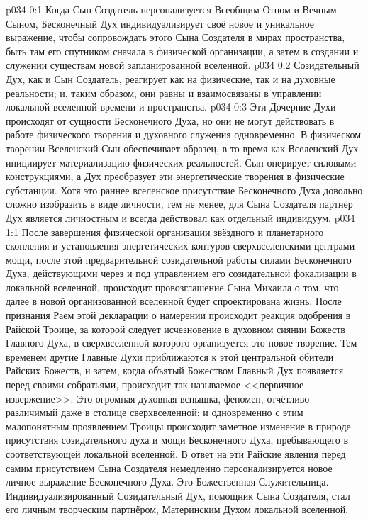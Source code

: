 \author{Могущественный Посланник}
\vs p034 0:1 Когда Сын Создатель персонализуется Всеобщим Отцом и Вечным Сыном, Бесконечный Дух индивидуализирует своё новое и уникальное выражение, чтобы сопровождать этого Сына Создателя в мирах пространства, быть там его спутником сначала в физической организации, а затем в создании и служении существам новой запланированной вселенной.
\vs p034 0:2 Созидательный Дух, как и Сын Создатель, реагирует как на физические, так и на духовные реальности; и, таким образом, они равны и взаимосвязаны в управлении локальной вселенной времени и пространства.
\vs p034 0:3 Эти Дочерние Духи происходят от сущности Бесконечного Духа, но они не могут действовать в работе физического творения и духовного служения одновременно. В физическом творении Вселенский Сын обеспечивает образец, в то время как Вселенский Дух инициирует материализацию физических реальностей. Сын оперирует силовыми конструкциями, а Дух преобразует эти энергетические творения в физические субстанции. Хотя это раннее вселенское присутствие Бесконечного Духа довольно сложно изобразить в виде личности, тем не менее, для Сына Создателя партнёр Дух является личностным и всегда действовал как отдельный индивидуум.
\vs p034 1:1 После завершения физической организации звёздного и планетарного скопления и установления энергетических контуров сверхвселенскими центрами мощи, после этой предварительной созидательной работы силами Бесконечного Духа, действующими через и под управлением его созидательной фокализации в локальной вселенной, происходит провозглашение Сына Михаила о том, что далее в новой организованной вселенной будет спроектирована жизнь. После признания Раем этой декларации о намерении происходит реакция одобрения в Райской Троице, за которой следует исчезновение в духовном сиянии Божеств Главного Духа, в сверхвселенной которого организуется это новое творение. Тем временем другие Главные Духи приближаются к этой центральной обители  Райских Божеств, и затем, когда объятый Божеством Главный Дух появляется перед своими собратьями, происходит так называемое <<первичное извержение>>. Это огромная духовная вспышка, феномен, отчётливо различимый даже в столице сверхвселенной; и одновременно с этим малопонятным проявлением Троицы происходит заметное изменение в природе присутствия созидательного духа и мощи Бесконечного Духа, пребывающего в соответствующей локальной вселенной. В ответ на эти Райские явления перед самим присутствием Сына Создателя немедленно персонализируется новое личное выражение Бесконечного Духа. Это Божественная Служительница. Индивидуализированный Созидательный Дух, помощник Сына Создателя, стал его личным творческим партнёром, Материнским Духом локальной вселенной.
